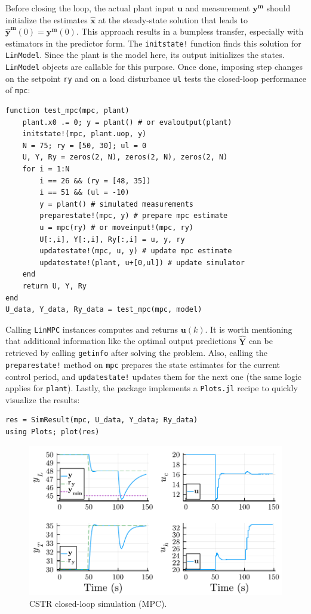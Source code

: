 Before closing the loop, the actual plant input $\mathbf{u}$ and measurement $\mathbf{y^m}$ should initialize the estimates $\mathbf{\hat{x}}$ at the steady-state solution that leads to $\mathbf{\hat{y}^m}(0)=\mathbf{y^m}(0)$. This approach results in a bumpless transfer, especially with estimators in the predictor form. The \texttt{initstate!} function finds this solution for \texttt{LinModel}. Since the plant is the model here, its output initializes the states. \texttt{LinModel} objects are callable for this purpose. Once done, imposing step changes on the setpoint \texttt{ry} and on a load disturbance \texttt{ul} tests the closed-loop performance of \texttt{mpc}:
\begin{verbatim}
function test_mpc(mpc, plant)
    plant.x0 .= 0; y = plant() # or evaloutput(plant)
    initstate!(mpc, plant.uop, y)
    N = 75; ry = [50, 30]; ul = 0
    U, Y, Ry = zeros(2, N), zeros(2, N), zeros(2, N)
    for i = 1:N
        i == 26 && (ry = [48, 35])
        i == 51 && (ul = -10)
        y = plant() # simulated measurements
        preparestate!(mpc, y) # prepare mpc estimate
        u = mpc(ry) # or moveinput!(mpc, ry)
        U[:,i], Y[:,i], Ry[:,i] = u, y, ry
        updatestate!(mpc, u, y) # update mpc estimate
        updatestate!(plant, u+[0,ul]) # update simulator
    end
    return U, Y, Ry
end
U_data, Y_data, Ry_data = test_mpc(mpc, model)
\end{verbatim}
Calling \texttt{LinMPC} instances computes and returns $\mathbf{u}(k)$. It is worth mentioning that additional information like the optimal output predictions $\mathbf{\hat{Y}}$ can be retrieved by calling \texttt{getinfo} after solving the problem. Also, calling the \texttt{preparestate!} method on \texttt{mpc} prepares the state estimates for the current control period, and \texttt{updatestate!} updates them for the next one (the same logic applies for \texttt{plant}). Lastly, the package implements a \texttt{Plots.jl} recipe \citep{plots} to quickly visualize the results:
\begin{verbatim}
res = SimResult(mpc, U_data, Y_data; Ry_data)
using Plots; plot(res)
\end{verbatim}

\begin{figure}[h]
    \centering
    \includegraphics[width=\columnwidth]{fig/plot_LinMPC1.pdf}
    \caption{CSTR closed-loop simulation (MPC).}\label{fig:plot_LinMPC1}
\end{figure}


